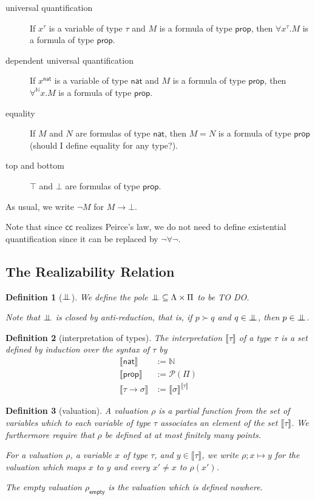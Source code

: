 \documentclass{article}
\newcommand{\N}{\mathbb{N}}
\newcommand{\nat}{\mathsf{nat}}
\newcommand{\depforall}[1]{\forall^\N #1.}
\newcommand{\pole}{{\bot\mkern-10mu\bot}}
\newcommand{\cc}{\mathsf{cc}}
\newcommand{\prop}{\mathsf{prop}}
\newcommand{\typeinterp}[1]{{\llbracket #1 \rrbracket}}
\newcommand{\powerset}[1]{\mathcal{P}(#1)}
\newcommand{\emptyval}{{\rho_\mathsf{empty}}}
\newtheorem{definition}{Definition}
\begin{document}
\begin{description}
\begin{description}
        \item[universal quantification] If $x^\tau$ is a variable of type $\tau$ and $M$ is a formula of type $\prop$, then $\forall x^\tau. M$ is a formula of type $\prop$.
        \item[dependent universal quantification] If $x^\nat$ is a variable of type $\nat$ and $M$ is a formula of type $\prop$, then $\depforall{x} M$ is a formula of type $\prop$.
        \item[equality] If $M$ and $N$ are formulas of type $\nat$, then $M = N$ is a formula of type $\prop$ (should I define equality for any type?).
        \item[top and bottom] $\top$ and $\bot$ are formulas of type $\prop$.
    \end{description}
\end{description}

As usual, we write $\neg M$ for $M \rightarrow \bot$.

Note that since $\cc$ realizes Peirce's law, we do not need to define existential quantification since it can be replaced by $\neg\forall\neg$.

\subsection{The Realizability Relation}

\begin{definition}[$\pole$]
    We define the pole $\pole \subseteq \Lambda \times \Pi$ to be TO DO.

    Note that $\pole$ is closed by anti-reduction, that is, if $p \succ q$ and $q \in \pole$, then $p \in \pole$.
\end{definition}

\begin{definition}[interpretation of types]
    The interpretation $\typeinterp{\tau}$ of a type $\tau$ is a set defined by induction over the syntax of $\tau$ by
    \begin{align*}
        \typeinterp{\nat} & := \N \\
        \typeinterp{\prop} & := \powerset{\Pi} \\
        \typeinterp{\tau \rightarrow \sigma} & := \typeinterp{\sigma}^\typeinterp{\tau}
    \end{align*}
\end{definition}

\begin{definition}[valuation]
    A valuation $\rho$ is a partial function from the set of variables which to each variable of type $\tau$ associates an element of the set $\typeinterp{\tau}$. We furthermore require that $\rho$ be defined at at most finitely many points.

    For a valuation $\rho$, a variable $x$ of type $\tau$, and $y \in \typeinterp{\tau}$, we write $\rho; x \mapsto y$ for the valuation which maps $x$ to $y$ and every $x' \ne x$ to $\rho(x')$.

    The empty valuation $\emptyval$ is the valuation which is defined nowhere.
\end{definition}
\end{document}
